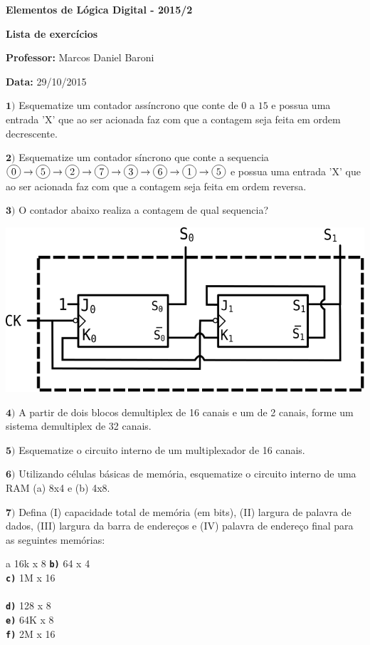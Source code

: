 \documentclass[12pt]{article}
\newcommand{\exerc}[3]{ \vspace*{25pt} {$\mathbf{#1)}$} #2 \hfill {\it #3} }
\newcommand{\exitem}[2]{ \texttt{\bf #1)} #2 \\ }
\newenvironment{exitems}[1]{
\\
\hspace*{30pt}
\begin{minipage}{0.8\textwidth}
\begin{multicols}{#1} 
}{
\end{multicols}
\end{minipage}
}
\newcommand*\circled[1]{\tikz[baseline=(char.base)]{
            \node[shape=circle,draw,inner sep=2pt] (char) {#1};}}
\begin{document}

\begin{center}
{\Large \bf Elementos de Lógica Digital - 2015/2}
\end{center}

{\large \bf Lista de exercícios}

{\bf Professor:} Marcos Daniel Baroni

{\bf Data:} 29/10/2015


\exerc{1}{Esquematize um contador assíncrono que conte de $0$ a $15$ e possua uma entrada 'X'
	que ao ser acionada faz com que a contagem seja feita em ordem decrescente.}{}

\exerc{2}{Esquematize um contador síncrono que conte a sequencia
	$\circled{0} \rightarrow
	\circled{5} \rightarrow
	\circled{2} \rightarrow
	\circled{7} \rightarrow
	\circled{3} \rightarrow
	\circled{6} \rightarrow
	\circled{1} \rightarrow \circled{5}$ e possua uma entrada 'X' que ao ser acionada faz com que a contagem
 	seja feita em ordem reversa.}{}

\exerc{3}{O contador abaixo realiza a contagem de qual sequencia?}{}
\begin{center}
		\includegraphics[scale=0.6]{cont1} \\ \vspace{15pt}
\end{center}

\exerc{4}{ A partir de dois blocos demultiplex de 16 canais e um de 2 canais, forme um sistema demultiplex de 32 canais.}{}

\exerc{5}{ Esquematize o circuito interno de um multiplexador de 16 canais.}{}

\exerc{6}{ Utilizando células básicas de memória, esquematize o circuito interno de uma RAM (a) 8x4 e (b) 4x8.}{}


\exerc{7}{Defina
(I) capacidade total de memória (em bits),
(II) largura de palavra de dados,
(III) largura da barra de endereços e
(IV) palavra de endereço final
para as seguintes memórias:}{}
\begin{exitems}{2}
	\exitem{a}{ 16k x 8 }
	\exitem{b}{ 64 x 4 }
	\exitem{c}{ 1M x 16 }
	\\
	\exitem{d}{ 128 x 8 }
	\exitem{e}{ 64K x 8 }
	\exitem{f}{ 2M x 16 }
\end{exitems}


\end{document}
